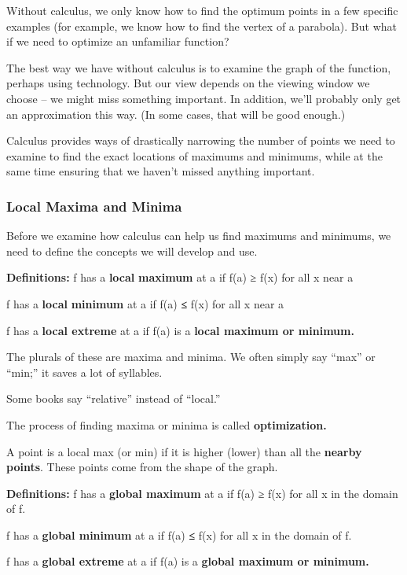 Without calculus, we only know how to find the optimum points in a few
specific examples (for example, we know how to find the vertex of a
parabola). But what if we need to optimize an unfamiliar function?

The best way we have without calculus is to examine the graph of the
function, perhaps using technology. But our view depends on the viewing
window we choose -- we might miss something important. In addition,
we'll probably only get an approximation this way. (In some cases, that
will be good enough.)

Calculus provides ways of drastically narrowing the number of points we
need to examine to find the exact locations of maximums and minimums,
while at the same time ensuring that we haven't missed anything
important.

\subsubsection{Local Maxima and Minima}\label{local-maxima-and-minima}

Before we examine how calculus can help us find maximums and minimums,
we need to define the concepts we will develop and use.

\textbf{Definitions:} f has a \textbf{local} \textbf{maximum} at a if
f(a) ≥ f(x) for all x near a

f has a \textbf{local} \textbf{minimum} at a if f(a) \textbf{≤} f(x) for
all x near a

f has a \textbf{local extreme} at a if f(a) is a \textbf{local maximum
or minimum.}

The plurals of these are maxima and minima. We often simply say ``max''
or ``min;'' it saves a lot of syllables.

Some books say ``relative'' instead of ``local.''

The process of finding maxima or minima is called \textbf{optimization.}

A point is a local max (or min) if it is higher (lower) than all the
\textbf{nearby points}. These points come from the shape of the graph.

\textbf{Definitions:} f has a \textbf{global maximum} at a if f(a) ≥
f(x) for all x in the domain of f.

f has a \textbf{global minimum} at a if f(a) \textbf{≤} f(x) for all x
in the domain of f.

f has a \textbf{global extreme} at a if f(a) is a \textbf{global maximum
or minimum.}

